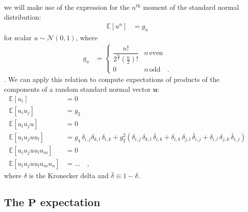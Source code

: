 \documentclass[modern]{aastex62}
\begin{document}
    we will make use of the expression for the
    $n^\mathrm{th}$ moment of the standard normal distribution:
    \begin{align}
        \mathbb{E}\left[ u^n \right] & = g_n
    \end{align}
    for scalar $u \sim \mathcal{N}(0, 1)$, where
    \begin{align}
        g_n
         & =
        \begin{cases}
            \dfrac{n!}{2^\frac{n}{2} \left(\frac{n}{2}\right)!} & n \, \mathrm{even}
            \\
            0                                                   & n \, \mathrm{odd}
            \quad.
        \end{cases}
    \end{align}
    \citep[e.g.,][]{Winkelbauer2012}.
    We can apply this relation to compute expectations
    of products of the components of a random standard normal vector $\mathbf{u}$:
    \begin{align}
        \mathbb{E}\left[u_i \right]                  & = 0
        \\[1em]
        \mathbb{E}\left[u_i u_j\right]               & = g_2
        \\[1em]
        \mathbb{E}\left[u_i u_j u\right]             & = 0
        \\[1em]
        \mathbb{E}\left[u_i u_j u u_l\right]         & =
        g_4 \, \delta_{i, j} \delta_{k, l} \, \delta_{i, k}
        +
        g_2^2 \left(
        \delta_{i, j} \, \delta_{k, l} \, \bar{\delta}_{i, k}
        +
        \delta_{i, k} \, \delta_{j, l} \, \bar{\delta}_{i, j}
        +
        \delta_{i, l} \, \delta_{j, k} \, \bar{\delta}_{i, j}
        \right)
        \\[1em]
        \mathbb{E}\left[u_i u_j u u_l u_m\right]     & = 0
        \\[1em]
        \mathbb{E}\left[u_i u_j u u_l u_m u_n\right] & =
        ...
        \quad,
    \end{align}
    where $\delta$ is the Kronecker delta and $\bar{\delta} \equiv 1 - \delta$.

    \subsection{The $\mathbf{P}$ expectation}
\end{document}
